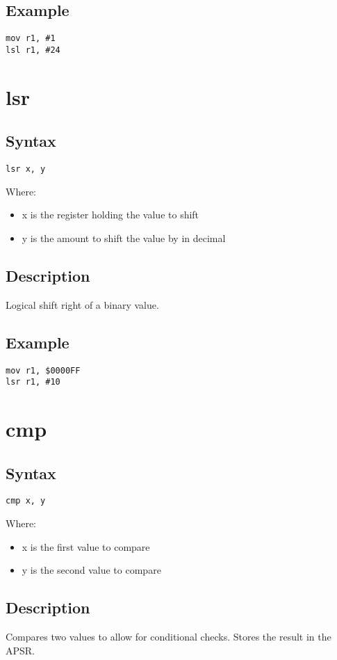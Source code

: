 \documentclass[11pt]{scrartcl}
\begin{document}
\subsection{Example}
\begin{verbatim}
mov r1, #1
lsl r1, #24
\end{verbatim}

\section{lsr}
\subsection{Syntax}
\begin{verbatim}
lsr x, y
\end{verbatim}
Where:
\begin{itemize}
    \item x is the register holding the value to shift
    \item y is the amount to shift the value by in decimal
\end{itemize}
\subsection{Description}
Logical shift right of a binary value.
\subsection{Example}
\begin{verbatim}
mov r1, $0000FF
lsr r1, #10
\end{verbatim}

\section{cmp}
\subsection{Syntax}
\begin{verbatim}
cmp x, y
\end{verbatim}
Where:
\begin{itemize}
    \item x is the first value to compare
    \item y is the second value to compare
\end{itemize}
\subsection{Description}
Compares two values to allow for conditional checks. Stores the result in
the APSR.
\end{document}
